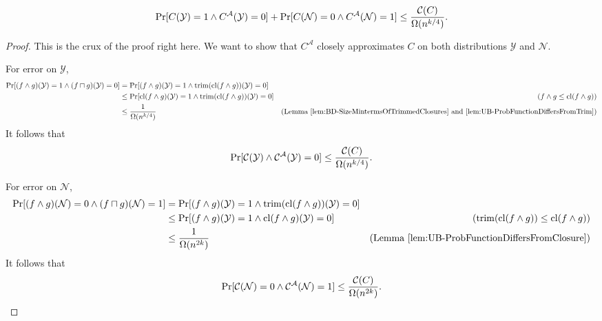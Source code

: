 \documentclass[11pt]{article}
\begin{document}
 	\begin{lemma}
 		\label{lem:UB-ApproxCircuitInequality}
 		\[\Pr[C(\mathcal{Y}) = 1 \land C^{\mathcal{A}}(\mathcal{Y}) = 0] + \Pr[C(\mathcal{N}) = 0 \land C^{\mathcal{A}}(\mathcal{N}) = 1] \leq \frac{\mathcal{C}(C)}{\Omega(n^{k/4})}.\]
 	\end{lemma}
 	\begin{proof}
 		This is the crux of the proof right here. We want to show that $C^{\mathcal{A}}$ closely approximates $C$ on both distributions $\mathcal{Y}$ and $\mathcal{N}$. 
 		
 		For error on $\mathcal{Y}$, 
 		\begin{align*}
 			\Pr[(f\land g)(\mathcal{Y}) = 1 \land (f\sqcap g)(\mathcal{Y}) = 0] &= \Pr[(f \land g)(\mathcal{Y}) = 1 \land \mathrm{trim}(\mathrm{cl}(f\land g))(\mathcal{Y}) = 0]\\
 			&\leq \Pr[\mathrm{cl}(f \land g)(\mathcal{Y}) = 1 \land \mathrm{trim}(\mathrm{cl}(f\land g))(\mathcal{Y}) = 0] &\mbox{($f\land g \leq \mathrm{cl}(f\land g))$}\\
 			&\leq \frac{1}{\Omega(n^{k/4})} &\mbox{(Lemma \ref{lem:BD-SizeMintermsOfTrimmedClosures} and  \ref{lem:UB-ProbFunctionDiffersFromTrim})}
 		\end{align*}
 		It follows that
 		\[\Pr[\mathcal{C}(\mathcal{Y}) \land \mathcal{C}^{\mathcal{A}}(\mathcal{Y}) = 0] \leq \frac{\mathcal{C}(C)}{\Omega(n^{k/4})}.\]
 		
 		For error on $\mathcal{N}$,
 		\begin{align*}
 			\Pr[(f\land g)(\mathcal{N}) = 0 \land (f\sqcap g)(\mathcal{N}) = 1] &= \Pr[(f \land g)(\mathcal{Y}) = 1 \land \mathrm{trim}(\mathrm{cl}(f\land g))(\mathcal{Y}) = 0]\\
 			&\leq \Pr[(f \land g)(\mathcal{Y}) = 1 \land \mathrm{cl}(f\land g)(\mathcal{Y}) = 0] &\mbox{($\mathrm{trim}(\mathrm{cl}(f\land g)) \leq \mathrm{cl}(f \land g)$)}\\
 			&\leq \frac{1}{\Omega(n^{2k})} &\mbox{(Lemma \ref{lem:UB-ProbFunctionDiffersFromClosure})}
 		\end{align*}
 		It follows that 
 		\[\Pr[\mathcal{C}(\mathcal{N}) = 0 \land \mathcal{C}^{\mathcal{A}}(\mathcal{N}) = 1] \leq \frac{\mathcal{C}(C)}{\Omega(n^{2k})}.\]
 	\end{proof}
 
\end{document}
